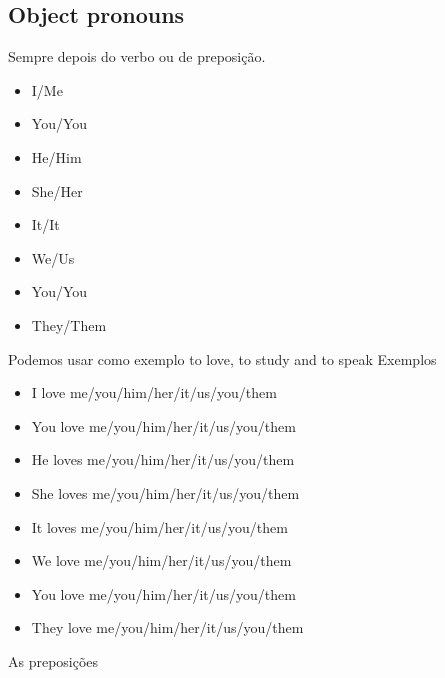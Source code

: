 \documentclass[12pt,a4paper]{article} %
\begin{document}
\subsection{Object pronouns}
Sempre depois do verbo ou de preposição.
\begin{itemize}
\item I/Me
\item You/You
\item He/Him
\item She/Her
\item It/It
\item We/Us
\item You/You
\item They/Them
\end{itemize}
Podemos usar como exemplo to love, to study and to speak
Exemplos
\begin{itemize}
\item I love me/you/him/her/it/us/you/them 
\item You love me/you/him/her/it/us/you/them
\item He loves me/you/him/her/it/us/you/them
\item She loves me/you/him/her/it/us/you/them
\item It loves me/you/him/her/it/us/you/them
\item We love me/you/him/her/it/us/you/them
\item You love me/you/him/her/it/us/you/them
\item They love me/you/him/her/it/us/you/them
\end{itemize}
As preposições
\end{document}
